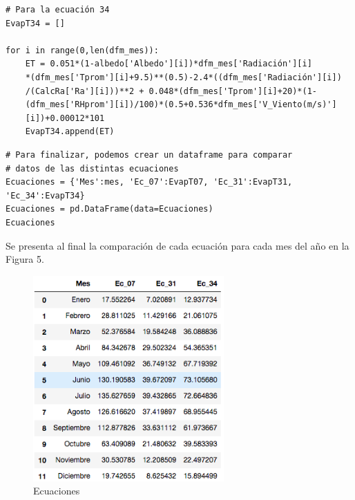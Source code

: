 \documentclass[11pt, spanish]{report}
\begin{document}
\begin{verbatim}
# Para la ecuación 34
EvapT34 = []

for i in range(0,len(dfm_mes)):
    ET = 0.051*(1-albedo['Albedo'][i])*dfm_mes['Radiación'][i]
    *(dfm_mes['Tprom'][i]+9.5)**(0.5)-2.4*((dfm_mes['Radiación'][i])
    /(CalcRa['Ra'][i]))**2 + 0.048*(dfm_mes['Tprom'][i]+20)*(1-
    (dfm_mes['RHprom'][i])/100)*(0.5+0.536*dfm_mes['V_Viento(m/s)']
    [i])+0.00012*101
    EvapT34.append(ET)
\end{verbatim}
\begin{verbatim}
# Para finalizar, podemos crear un dataframe para comparar
# datos de las distintas ecuaciones
Ecuaciones = {'Mes':mes, 'Ec_07':EvapT07, 'Ec_31':EvapT31, 'Ec_34':EvapT34}
Ecuaciones = pd.DataFrame(data=Ecuaciones)
Ecuaciones
\end{verbatim}
Se presenta al final la comparación de cada ecuación para cada mes del año en la Figura 5.
\begin{figure}[ht]
\caption{Ecuaciones}
\centering
\includegraphics[width=0.65\textwidth]{figura5.png}
\end{figure}
\end{document}

